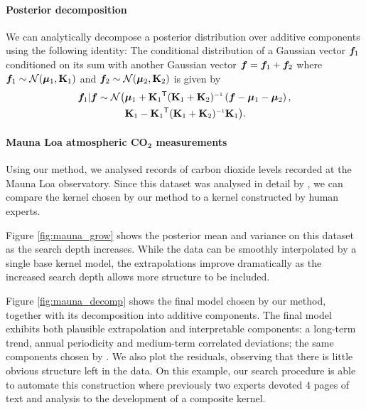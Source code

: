 \paragraph{Posterior decomposition}
\label{sec:decomposing}
We can analytically decompose a \gp{} posterior distribution over additive components using the following identity:
The conditional distribution of a Gaussian vector $\boldsymbol{f}_1$ conditioned on its sum with another Gaussian vector $\boldsymbol{f} = \boldsymbol{f}_1 + \boldsymbol{f}_2$ where $\boldsymbol{f}_1 \sim \mathcal{N}\!\left({\boldsymbol{\mu}}_1,\mathbf{K}_1\right)$ and $\boldsymbol{f}_2 \sim \mathcal{N}\!\left({\boldsymbol{\mu}}_2,\mathbf{K}_2\right)$ is given by
\begin{align}
\vf_1 | \vf \sim \mathcal{N} \big( & \vmu_1 + \vK_1\tra (\vK_1 + \vK_2)\inv \left( \vf - \vmu_1 - \vmu_2 \right), \nonumber \\
& \vK_1 - \vK_1\tra (\vK_1 + \vK_2)\inv \vK_1 \big) \nonumber .
\end{align}

\paragraph{Mauna Loa atmospheric CO$\mathbf{_{2}}$ measurements}

Using our method, we analysed records of carbon dioxide levels recorded at the Mauna Loa observatory.
Since this dataset was analysed in detail by \citet{Rasmussen2006-ml}, we can compare the kernel chosen by our method to a kernel constructed by human experts.




Figure \ref{fig:mauna_grow} shows the posterior mean and variance on this dataset as the search depth increases.
While the data can be smoothly interpolated by a single base kernel model, the extrapolations improve dramatically as the increased search depth allows more structure to be included.

Figure \ref{fig:mauna_decomp} shows the final model chosen by our method, together with its decomposition into additive components.
The final model exhibits both plausible extrapolation and interpretable components: a long-term trend, annual periodicity and medium-term correlated deviations; the same components chosen by \citet{Rasmussen2006-ml}.
We also plot the residuals, observing that there is little obvious structure left in the data.  
On this example, our search procedure is able to automate this construction where previously two \gp{} experts devoted 4 pages of text and analysis to the development of a composite kernel.

